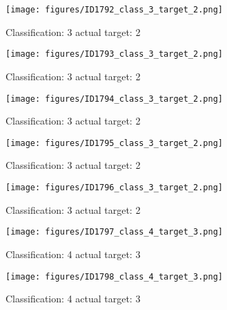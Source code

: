 \begin{figure}[h!]
\begin{center}
\texttt{[image: figures/ID1792\_class\_3\_target\_2.png]}
\end{center}
\caption{ Classification: 3 actual target: 2}
\label{fig:ID1792_class_3_target_2}
\end{figure}
\begin{figure}[h!]
\begin{center}
\texttt{[image: figures/ID1793\_class\_3\_target\_2.png]}
\end{center}
\caption{ Classification: 3 actual target: 2}
\label{fig:ID1793_class_3_target_2}
\end{figure}
\begin{figure}[h!]
\begin{center}
\texttt{[image: figures/ID1794\_class\_3\_target\_2.png]}
\end{center}
\caption{ Classification: 3 actual target: 2}
\label{fig:ID1794_class_3_target_2}
\end{figure}
\begin{figure}[h!]
\begin{center}
\texttt{[image: figures/ID1795\_class\_3\_target\_2.png]}
\end{center}
\caption{ Classification: 3 actual target: 2}
\label{fig:ID1795_class_3_target_2}
\end{figure}
\begin{figure}[h!]
\begin{center}
\texttt{[image: figures/ID1796\_class\_3\_target\_2.png]}
\end{center}
\caption{ Classification: 3 actual target: 2}
\label{fig:ID1796_class_3_target_2}
\end{figure}
\begin{figure}[h!]
\begin{center}
\texttt{[image: figures/ID1797\_class\_4\_target\_3.png]}
\end{center}
\caption{ Classification: 4 actual target: 3}
\label{fig:ID1797_class_4_target_3}
\end{figure}
\begin{figure}[h!]
\begin{center}
\texttt{[image: figures/ID1798\_class\_4\_target\_3.png]}
\end{center}
\caption{ Classification: 4 actual target: 3}
\label{fig:ID1798_class_4_target_3}
\end{figure}
